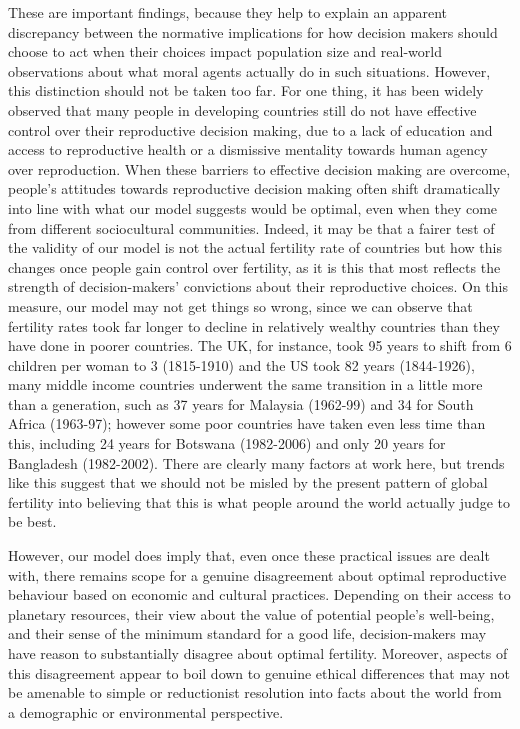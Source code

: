 \documentclass[man,11pt,a4paper,floatsintext]{apa7}
\begin{document}
These are important findings, because they help to explain an apparent discrepancy between the normative implications for how decision makers should choose to act when their choices impact population size and real-world observations about what moral agents actually do in such situations. However, this distinction should not be taken too far. For one thing, it has been widely observed that many people in developing countries still do not have effective control over their reproductive decision making, due to a lack of education and access to reproductive health or a dismissive mentality towards human agency over reproduction. When these barriers to effective decision making are overcome, people's attitudes towards reproductive decision making often shift dramatically into line with what our model suggests would be optimal, even when they come from different sociocultural communities. Indeed, it may be that a fairer test of the validity of our model is not the actual fertility rate of countries but how this changes once people gain control over fertility, as it is this that most reflects the strength of decision-makers' convictions about their reproductive choices. On this measure, our model may not get things so wrong, since we can observe that fertility rates took far longer to decline in relatively wealthy countries than they have done in poorer countries. The UK, for instance, took 95 years to shift from 6 children per woman to 3 (1815-1910) and the US took 82 years (1844-1926), many middle income countries underwent the same transition in a little more than a generation, such as 37 years for Malaysia (1962-99) and 34 for South Africa (1963-97); however some poor countries have taken even less time than this, including 24 years for Botswana (1982-2006) and only 20 years for Bangladesh (1982-2002). There are clearly many factors at work here, but trends like this suggest that we should not be misled by the present pattern of global fertility into believing that this is what people around the world actually judge to be best.

However, our model does imply that, even once these practical issues are dealt with, there remains scope for a genuine disagreement about optimal reproductive behaviour based on economic and cultural practices. Depending on their access to planetary resources, their view about the value of potential people's well-being, and their sense of the minimum standard for a good life, decision-makers may have reason to substantially disagree about optimal fertility. Moreover, aspects of this disagreement appear to boil down to genuine ethical differences that may not be amenable to simple or reductionist resolution into facts about the world from a demographic or environmental perspective.
\end{document}
